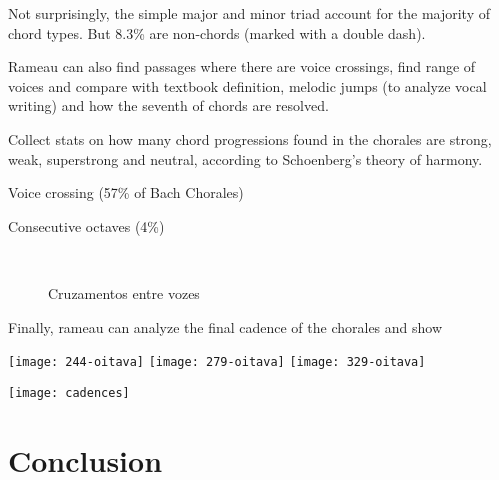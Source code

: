 Not surprisingly, the simple major and minor triad account for the
majority of chord types. But 8.3\% are non-chords (marked with a
double dash).

Rameau can also find passages where there are voice crossings, find
range of voices and compare with textbook definition, melodic jumps
(to analyze vocal writing) and how the seventh of chords are resolved.

    Collect stats on how many chord
progressions found in the chorales are strong, weak, superstrong and
neutral, according to Schoenberg's theory of harmony.

  Voice crossing (57\% of Bach Chorales)

Consecutive octaves (4\%)

\begin{figure}[!h]
  \centering
   \\
  \caption{Cruzamentos entre vozes}
  \label{fig:coral-003}
\end{figure}

Finally, rameau can analyze the final cadence of the chorales and show

    \texttt{[image: 244-oitava]}
    \texttt{[image: 279-oitava]}
    \texttt{[image: 329-oitava]}

  \texttt{[image: cadences]}

\section{Conclusion}
\label{sec:conclusion}


